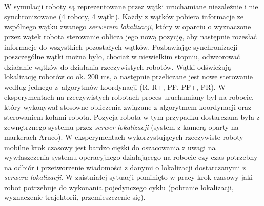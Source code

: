 \section*{}
\begin{frame}
\frametitle{\secname}
\normalsize

W symulacji roboty są reprezentowane przez wątki uruchamiane niezależnie i nie synchronizowane (4 roboty, 4 wątki). Każdy z wątków pobiera informacje ze wspólnego wątku zwanego \textit{serwerem lokalizacji}, który w oparciu o wyznaczone przez wątek robota sterowanie oblicza jego nową pozycję, aby następnie rozesłać informacje do wszystkich pozostałych wątków. Pozbawiając synchronizacji poszczególne wątki można było, chociaż w niewielkim stopniu, odwzorować działanie wątków do działania rzeczywistych robotów. Wątki odświeżają lokalizację robotów co ok. 200 ms, a następnie przeliczane jest nowe sterowanie według jednego z~algorytmów koordynacji (R, R+, PF, PF+, PR).
\newline
\newline
W eksperymentach na rzeczywistych robotach proces uruchamiany był na robocie, który wykonywał stosowne obliczenia związane z algorytmem koordynacji oraz sterowaniem kołami robota. Pozycja robota w tym przypadku dostarczana była z zewnętrznego systemu przez \textit{serwer lokalizacji} (system z kamerą oparty na markerach Aruco). W eksperymentach wykorzystujących rzeczywiste roboty mobilne krok czasowy jest bardzo ciężki do oszacowania z uwagi na wywłaszczenia systemu operacyjnego działającego na robocie czy czas potrzebny na odbiór i przetworzenie wiadomości z danymi o lokalizacji dostarczanymi z \textit{serwera lokalizacji}. W zaistniałej sytuacji pominięto w pracy krok czasowy jaki robot potrzebuje do wykonania pojedynczego cyklu (pobranie lokalizacji,  wyznaczenie trajektorii, przemieszczenie się). 


\end{frame}
